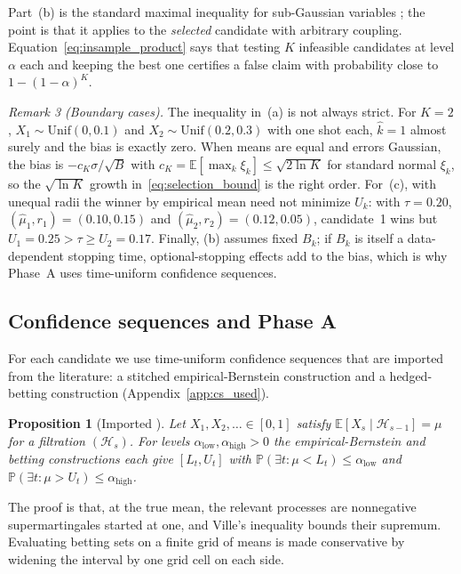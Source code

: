 \documentclass[a4paper,onecolumn,unpublished]{quantumarticle}
\newcommand{\Prob}{\mathbb{P}}
\newcommand{\E}{\mathbb{E}}
\newcommand{\Hfil}{\mathcal{H}}
\begin{document}
Part~(b) is the standard maximal inequality for sub-Gaussian variables \cite{massart2007}; the point is that it applies to the \emph{selected} candidate with arbitrary coupling. Equation~\eqref{eq:insample_product} says that testing $K$ infeasible candidates at level $\alpha$ each and keeping the best one certifies a false claim with probability close to $1 - (1 - \alpha)^K$.

\medskip\noindent\emph{Remark 3 (Boundary cases).}\label{rem:boundary_cases}
The inequality in~(a) is not always strict. For $K = 2$, $X_1 \sim \mathrm{Unif}(0, 0.1)$ and $X_2 \sim \mathrm{Unif}(0.2, 0.3)$ with one shot each, $\hat k = 1$ almost surely and the bias is exactly zero. When means are equal and errors Gaussian, the bias is $-c_K\sigma/\sqrt{B}$ with $c_K = \E[\max_k \xi_k] \le \sqrt{2\ln K}$ for standard normal $\xi_k$, so the $\sqrt{\ln K}$ growth in~\eqref{eq:selection_bound} is the right order. For~(c), with unequal radii the winner by empirical mean need not minimize $U_k$: with $\tau = 0.20$, $(\widehat\mu_1, r_1) = (0.10, 0.15)$ and $(\widehat\mu_2, r_2) = (0.12, 0.05)$, candidate~1 wins but $U_1 = 0.25 > \tau \ge U_2 = 0.17$. Finally, (b) assumes fixed $B_k$; if $B_k$ is itself a data-dependent stopping time, optional-stopping effects add to the bias, which is why Phase~A uses time-uniform confidence sequences.

\subsection{Confidence sequences and Phase A}
\label{subsec:cs_phaseA}

For each candidate we use time-uniform confidence sequences that are imported from the literature: a stitched empirical-Bernstein construction \cite{howard2021} and a hedged-betting construction \cite{waudby2024} (Appendix~\ref{app:cs_used}).

\medskip\noindent\textbf{Proposition 1} (Imported \cite{howard2021,waudby2024}).\label{prop:cs_validity}
\emph{Let $X_1, X_2, \dots \in [0, 1]$ satisfy $\E[X_s \mid \Hfil_{s-1}] = \mu$ for a filtration $(\Hfil_s)$. For levels $\alpha_{\mathrm{low}}, \alpha_{\mathrm{high}} > 0$ the empirical-Bernstein and betting constructions each give $[L_t, U_t]$ with $\Prob(\exists t : \mu < L_t) \le \alpha_{\mathrm{low}}$ and $\Prob(\exists t : \mu > U_t) \le \alpha_{\mathrm{high}}$.}

\medskip
The proof is that, at the true mean, the relevant processes are nonnegative supermartingales started at one, and Ville's inequality \cite{ville1939} bounds their supremum. Evaluating betting sets on a finite grid of means is made conservative by widening the interval by one grid cell on each side.
\end{document}
